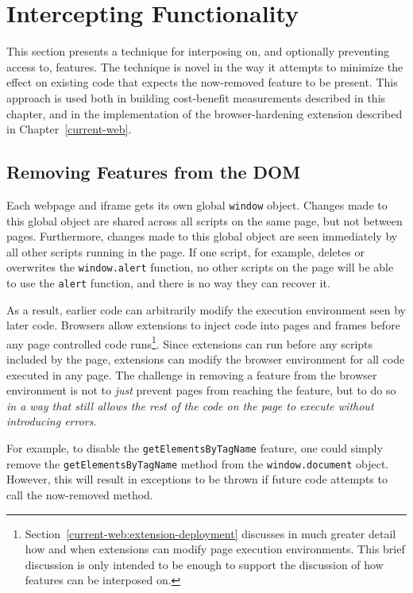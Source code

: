 \section{Intercepting \JS Functionality}
\label{cost-benefit:intercepting-js}

This section presents a technique for interposing on, and optionally preventing
access to, \WAPI features.  The technique is novel in the way it attempts to
minimize the effect on existing code that expects the now-removed feature to be
present.  This approach is used both in building cost-benefit measurements
described in this chapter, and in the implementation of the browser-hardening
extension described in Chapter~\ref{current-web}.


\subsection{Removing Features from the DOM}
\label{cost-benefit:intercepting-js:featremove}
Each webpage and iframe gets its own global \texttt{window} object.  Changes
made to this global object are shared across all scripts on the same page, but
not between pages.  Furthermore, changes made to this global object are seen
immediately by all other scripts running in the page.  If one script, for
example, deletes or overwrites the \texttt{window.alert} function, no other
scripts on the page will be able to use the \texttt{alert} function, and there
is no way they can recover it.

As a result, earlier code can arbitrarily modify the execution environment seen
by later code.  Browsers allow extensions to inject \JS code into pages and
frames before any page controlled code
runs\footnote{Section~\ref{current-web:extension-deployment} discusses in much
greater detail how and when extensions can modify page execution environments.
This brief discussion is only intended to be enough to support the discussion
of how \WAPI features can be interposed on.}. Since extensions can run
before any scripts included by the page, extensions can modify the browser
environment for all code executed in any page.  The challenge in removing a
feature from the browser environment is not to \emph{just} prevent pages from
reaching the feature, but to do so \emph{in a way that still allows the rest of
the code on the page to execute without introducing errors}.

For example, to disable the \texttt{getElementsByTagName} feature, one could
simply remove the \texttt{getElementsByTagName} method from the
\texttt{window.document} object. However, this will result in exceptions to
be thrown if future code attempts to call the now-removed method.

